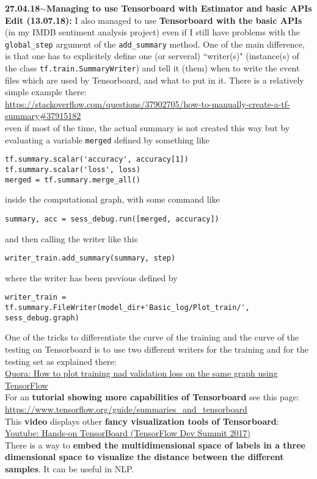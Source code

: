 \documentclass[11pt,a4paper]{article}
\newenvironment{loggentry}[2]%
{\noindent\textbf{#1}\hspace{1cm}$\mathbf{\sim}$\text{ }\textbf{#2}\\}{\vspace{0.5cm}}
\begin{document}
\begin{loggentry}{27.04.18}{Managing to use Tensorboard with Estimator and basic APIs}
\textbf{Edit (13.07.18):} I also managed to use \textbf{Tensorboard with the basic APIs} (in my IMDB sentiment analysis project) even if I still have problems with the \texttt{global\_step} argument of the \texttt{add\_summary} method. One of the main difference, is that one has to explicitely define one (or serveral) ``writer(s)" (instance(s) of the class \texttt{tf.train.SummaryWriter}) and tell it (them) when to write the event files which are used by Tensorboard, and what to put in it. There is a relatively simple example there:\\
\url{https://stackoverflow.com/questions/37902705/how-to-manually-create-a-tf-summary#37915182}\\
even if most of the time, the actual summary is not created this way but by evaluating a variable \texttt{merged} defined by something like
\begin{verbatim}
tf.summary.scalar('accuracy', accuracy[1])
tf.summary.scalar('loss', loss)
merged = tf.summary.merge_all()
\end{verbatim}
inside the computational graph, with some command like
\begin{verbatim}
summary, acc = sess_debug.run([merged, accuracy])
\end{verbatim}
and then calling the writer like this
\begin{verbatim}
writer_train.add_summary(summary, step)
\end{verbatim}
where the writer has been previous defined by
\begin{verbatim}
writer_train = tf.summary.FileWriter(model_dir+'Basic_log/Plot_train/', sess_debug.graph)
\end{verbatim}
One of the tricks to differentiate the curve of the training and the curve of the testing on Tensorboard is to use two different writers for the training and for the testing set as explained there:\\
\href{https://www.quora.com/How-do-you-plot-training-and-validation-loss-on-the-same-graph-using-TensorFlow%E2%80%99s-TensorBoard}{Quora: How to plot training nad validation loss on the same graph using TensorFlow}\\

For an \textbf{tutorial showing more capabilities of Tensorboard} see this page:\\
\url{https://www.tensorflow.org/guide/summaries_and_tensorboard}\\

This \textbf{video} displays other \textbf{fancy visualization tools of Tensorboard}:\\
\href{https://www.youtube.com/watch?v=eBbEDRsCmv4}{Youtube: Hands-on TensorBoard (TensorFlow Dev Summit 2017)}\\
There is a way to \textbf{embed the multidimensional space of labels in a three dimensional space to visualize the distance between the different samples}. It can be useful in NLP.


\end{loggentry}
\end{document}
